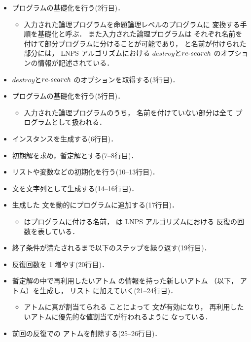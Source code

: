 \begin{itemize}
\item {} プログラムの基礎化を行う(2行目)．
 \begin{itemize}
  \item 入力された論理プログラムを命題論理レベルのプログラムに
  変換する手順を基礎化と呼ぶ．
  また入力された論理プログラムは
  それぞれ名前を付けて部分プログラムに分けることが可能であり，
   と名前が付けられた部分には，
  LNPS アルゴリズムにおける
  $destroy$と$re\mathchar`-search$ のオプションの情報が記述されている．
 \end{itemize}
\item $destroy$と$re\mathchar`-search$ のオプションを取得する(3行目)．
\item {} プログラムの基礎化を行う(5行目)．
 \begin{itemize}
  \item 入力された論理プログラムのうち，
  名前を付けていない部分は全て
   プログラムとして扱われる．
 \end{itemize}
\item インスタンスを生成する(6行目)．
\item 初期解を求め，暫定解とする(7--8行目)．
\item リストや変数などの初期化を行う(10--13行目)．
\item {}文を文字列として生成する(14--16行目)．
\item 生成した 文を動的にプログラムに追加する(17行目)．
 \begin{itemize}
  \item {} はプログラムに付ける名前，
   は LNPS アルゴリズムにおける
  反復の回数を表している．
 \end{itemize}
\item 終了条件が満たされるまで以下のステップを繰り返す(19行目)．
\item 反復回数を 1 増やす(20行目)．
\item 暫定解の中で再利用したいアトム
の情報を持った新しいアトム
（以下， アトム）を生成し，
リスト  に加えていく(21--24行目)．
 \begin{itemize}
  \item {} アトムに真が割当てられる
  ことによって 文が有効になり，
  再利用したいアトムに優先的な値割当てが行われるように
  なっている．
 \end{itemize}
\item 前回の反復での  アトムを削除する(25--26行目)．

\end{itemize}
